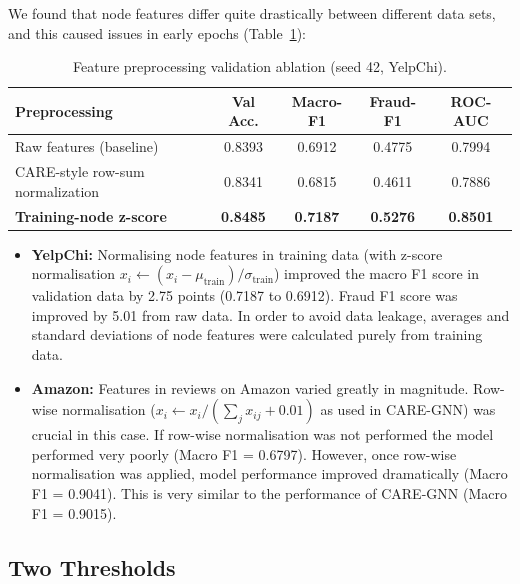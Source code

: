 We found that node features differ quite drastically between different data sets, and this caused issues in early epochs (Table~\ref{tab:feature_ablation}):

\begin{table}[htbp]
\centering
\small
\setlength{\tabcolsep}{3.5pt}
\caption[Feature preprocessing validation ablation]{Feature preprocessing validation ablation (seed 42, YelpChi).}
\label{tab:feature_ablation}
\begin{tabular*}{\textwidth}{@{\extracolsep{\fill}}lcccc}
\toprule
\textbf{Preprocessing} & \textbf{Val Acc.} & \textbf{Macro-F1} & \textbf{Fraud-F1} & \textbf{ROC-AUC} \\
\midrule
Raw features (baseline)             & 0.8393 & 0.6912 & 0.4775 & 0.7994 \\
CARE-style row-sum normalization    & 0.8341 & 0.6815 & 0.4611 & 0.7886 \\
\textbf{Training-node z-score}      & \textbf{0.8485} & \textbf{0.7187} & \textbf{0.5276} & \textbf{0.8501} \\
\bottomrule
\end{tabular*}
\end{table}

\begin{itemize}
    \item \textbf{YelpChi:} Normalising node features in training data (with z-score normalisation $x_i \leftarrow (x_i - \mu_{\text{train}}) / \sigma_{\text{train}}$) improved the macro F1 score in validation data by 2.75 points (0.7187 to 0.6912). Fraud F1 score was improved by 5.01 from raw data. In order to avoid data leakage, averages and standard deviations of node features were calculated purely from training data.
    \item \textbf{Amazon:} Features in reviews on Amazon varied greatly in magnitude. Row-wise normalisation ($x_i \leftarrow x_i / (\sum_j x_{ij} + 0.01)$ as used in CARE-GNN) was crucial in this case. If row-wise normalisation was not performed the model performed very poorly (Macro F1 = 0.6797). However, once row-wise normalisation was applied, model performance improved dramatically (Macro F1 = 0.9041). This is very similar to the performance of CARE-GNN (Macro F1 = 0.9015).
\end{itemize}

\subsection{Two Thresholds}
\label{subsec:dual_threshold}

